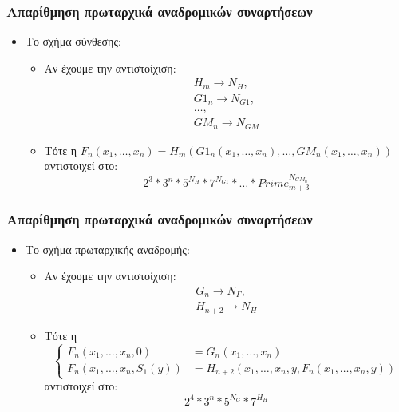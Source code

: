 \documentclass{beamer}
\begin{document}
\begin{frame}
        \frametitle{Απαρίθμηση πρωταρχικά αναδρομικών συναρτήσεων}
        \begin{itemize}
                \item Το σχήμα σύνθεσης:
                \begin{itemize}
                        \item Αν έχουμε την αντιστοίχιση:
                                \[\begin{array}{l}
                                        H_m \rightarrow N_H,\\
                                        G1_n \rightarrow N_{G1},\\
                                        \ldots,\\
                                        GM_n \rightarrow N_{GM}
                                \end{array}\]
                \pause
                        \item Τότε η \( F_n(x_1,\ldots,x_n) = H_m(G1_n(x_1,\ldots,x_n),\ldots,GM_n(x_1,\ldots,x_n)) \)
                        αντιστοιχεί στο:
                        \[
                                2^3*3^n*5^{N_H}*7^{N_{G1}}*\ldots*Prime_{m+3}^{N_{GM_n}}
                        \]
                \end{itemize}                   
        \end{itemize}
\end{frame}

\begin{frame}
        \frametitle{Απαρίθμηση πρωταρχικά αναδρομικών συναρτήσεων}
        \begin{itemize}
                \item Το σχήμα πρωταρχικής αναδρομής:
                \begin{itemize}
                        \item Αν έχουμε την αντιστοίχιση:
                                \[\begin{array}{l}
                                        G_n \rightarrow N_Γ,\\
                                        H_{n+2} \rightarrow N_H
                                \end{array}\]
                \pause
                        \item Τότε η 
                        \[\left\{
                                \begin{array}{ll}
                                        F_n(x_1,\ldots,x_n, 0) &= G_n(x_1,\ldots,x_n) \\
                                        F_n(x_1,\ldots,x_n, S_1(y)) &= H_{n+2}(x_1,\ldots,x_n, y , F_n(x_1,\ldots,x_n, y))
                                \end{array}
                        \right.\]
                        αντιστοιχεί στο:
                        \[
                                2^4*3^n*5^{N_G}*7^{H_H}
                        \]
                \end{itemize}                   
        \end{itemize}
\end{frame}
\end{document}
